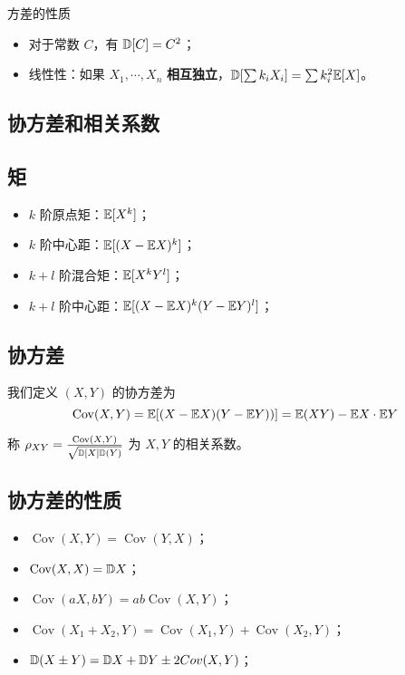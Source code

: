 方差的性质
\begin{itemize}
	\item 对于常数 $C$，有 $\mathbb{D}[C] = C^2$；
	\item 线性性：如果 $X_1, \cdots, X_n$ \textbf{相互独立}，$\mathbb{D}[\sum k_iX_i] = \sum k_i^2 \mathbb{E} [X]$。
\end{itemize}

\subsection{协方差和相关系数}

\subsection*{矩}
\begin{itemize}
	\item $k$ 阶原点矩：$\mathbb{E}[X^k]$；
	\item $k$ 阶中心距：$\mathbb{E}[(X - \mathbb{E} X)^k]$；
	\item $k + l$ 阶混合矩：$\mathbb{E}[X^k Y^l]$；
	\item $k + l$ 阶中心距：$\mathbb{E}[(X - \mathbb{E} X)^k (Y - \mathbb{E} Y)^l]$；
\end{itemize}

\subsection*{协方差}

\newcommand{\opCov}{\operatorname{Cov}}

我们定义 $(X, Y)$ 的协方差为
\[ \opCov(X, Y) = \bbE[(X - \bbE X)(Y - \bbE Y))] = \bbE(XY) - \bbE X \cdot \bbE Y \]

称 $\rho_{XY} = \frac{\opCov(X, Y)}{\sqrt{\bbD [X] \bbD(Y)}}$ 为 $X, Y$ 的相关系数。



\subsection*{协方差的性质}

\begin{itemize}
	\item $\opCov(X, Y) = \opCov(Y, X)$；
	\item $\opCov(X, X) = \bbD X$；
	\item $\opCov(aX, bY) = ab \opCov(X, Y)$；
	\item $\opCov(X_1 + X_2, Y) = \opCov(X_1, Y) + \opCov(X_2, Y)$；
	\item $\mathbb{D}(X \pm Y) = \mathbb{D} X + \mathbb{D} Y \pm 2Cov(X, Y)$；
\end{itemize}

